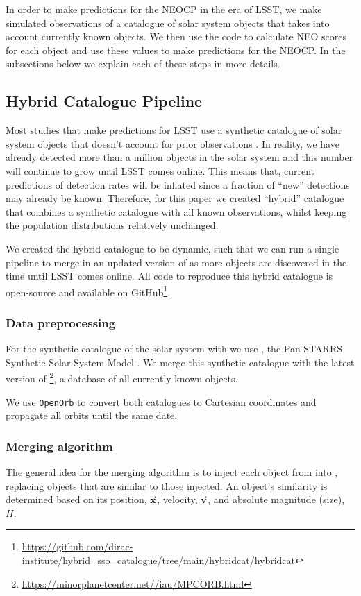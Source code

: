 In order to make predictions for the NEOCP in the era of LSST, we make simulated observations of a catalogue of solar system objects that takes into account currently known objects. We then use the \dig{} code to calculate NEO scores for each object and use these values to make predictions for the NEOCP. In the subsections below we explain each of these steps in more details.

\subsection{Hybrid Catalogue Pipeline}
Most studies that make predictions for LSST use a synthetic catalogue of solar system objects that doesn't account for prior observations \needcite{}. In reality, we have already detected more than a million objects in the solar system and this number will continue to grow until LSST comes online. This means that, current predictions of detection rates will be inflated since a fraction of ``new'' detections may already be known. Therefore, for this paper we created ``hybrid'' catalogue that combines a synthetic catalogue with all known observations, whilst keeping the population distributions relatively unchanged.

We created the hybrid catalogue to be dynamic, such that we can run a single pipeline to merge in an updated version of \mpco{} as more objects are discovered in the time until LSST comes online. All code to reproduce this hybrid catalogue is open-source and available on GitHub\footnote{\url{https://github.com/dirac-institute/hybrid_sso_catalogue/tree/main/hybridcat/hybridcat}}.

\subsubsection{Data preprocessing}
For the synthetic catalogue of the solar system with we use \sss{}, the Pan-STARRS Synthetic Solar System Model \citep{Grav+2011}. We merge this synthetic catalogue with the latest version of \mpco{}\footnote{\url{https://minorplanetcenter.net//iau/MPCORB.html}}, a database of all currently known objects.

We use \texttt{OpenOrb} \citep{Granvik+2009} to convert both catalogues to Cartesian coordinates and propagate all orbits until the same date.

\subsubsection{Merging algorithm}
The general idea for the merging algorithm is to inject each object from \mpco{} into \sss{}, replacing objects that are similar to those injected. An object's similarity is determined based on its position, $\va{x}$, velocity, $\va{v}$, and absolute magnitude (size), ${H}$.

